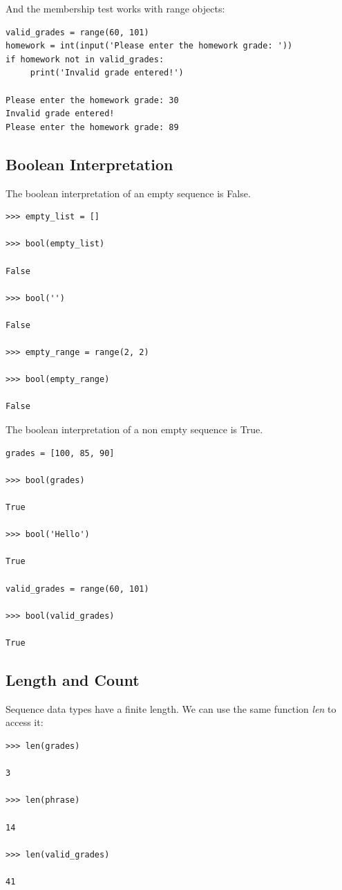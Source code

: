 \documentclass{article}
\begin{document}
And the membership test works with range objects:

\begin{lstlisting}
valid_grades = range(60, 101)
homework = int(input('Please enter the homework grade: '))
if homework not in valid_grades:
     print('Invalid grade entered!')
 
Please enter the homework grade: 30
Invalid grade entered!
Please enter the homework grade: 89
\end{lstlisting}

\subsection{Boolean Interpretation}

The boolean interpretation of an empty sequence is False.

\begin{lstlisting}
>>> empty_list = []

>>> bool(empty_list)

False

>>> bool('')

False

>>> empty_range = range(2, 2)

>>> bool(empty_range)

False
\end{lstlisting}

The boolean interpretation of a non empty sequence is True.

\begin{lstlisting}
grades = [100, 85, 90]

>>> bool(grades)

True

>>> bool('Hello')

True

valid_grades = range(60, 101)

>>> bool(valid_grades)

True
\end{lstlisting}

\subsection{Length and Count}

Sequence data types have a finite length.  We can use the same function \textit{len} to access it:

\begin{lstlisting}
>>> len(grades)

3

>>> len(phrase)

14

>>> len(valid_grades)

41
\end{lstlisting}
\end{document}
